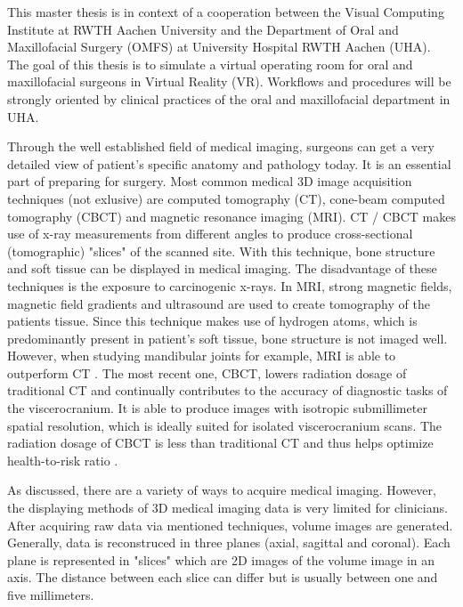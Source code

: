 This master thesis is in context of a cooperation between the Visual Computing Institute at RWTH Aachen University and the Department of Oral and Maxillofacial Surgery (OMFS) at University Hospital RWTH Aachen (UHA).
The goal of this thesis is to simulate a virtual operating room for oral and maxillofacial surgeons in Virtual Reality (VR).
Workflows and procedures will be strongly oriented by clinical practices of the oral and maxillofacial department in UHA.

Through the well established field of medical imaging, surgeons can get a very detailed view of patient’s specific anatomy and pathology today. 
It is an essential part of preparing for surgery.
Most common medical 3D image acquisition techniques (not exlusive) are computed tomography (CT), cone-beam computed tomography (CBCT) and magnetic resonance imaging (MRI).
CT / CBCT makes use of x-ray measurements from different angles to produce cross-sectional (tomographic) "slices" of the scanned site.
With this technique, bone structure and soft tissue can be displayed in medical imaging.
The disadvantage of these techniques is the exposure to carcinogenic x-rays.
In MRI, strong magnetic fields, magnetic field gradients and ultrasound are used to create tomography of the patients tissue.
Since this technique makes use of hydrogen atoms, which is predominantly present in patient's soft tissue, bone structure is not imaged well.
However, when studying mandibular joints for example, MRI is able to outperform CT \cite{RN65}.
The most recent one, CBCT, lowers radiation dosage of traditional CT and continually contributes to the accuracy of diagnostic tasks of the viscerocranium.
It is able to produce images with isotropic submillimeter spatial resolution, which is ideally suited for isolated viscerocranium scans. 
The radiation dosage of CBCT is less than traditional CT and thus helps optimize health-to-risk ratio \cite{WHITE2008689}.

As discussed, there are a variety of ways to acquire medical imaging.
However, the displaying methods of 3D medical imaging data is very limited for clinicians.
After acquiring raw data via mentioned techniques, volume images are generated. 
Generally, data is reconstruced in three planes (axial, sagittal and coronal).
Each plane is represented in "slices" which are 2D images of the volume image in an axis.
The distance between each slice can differ but is usually between one and five millimeters.

